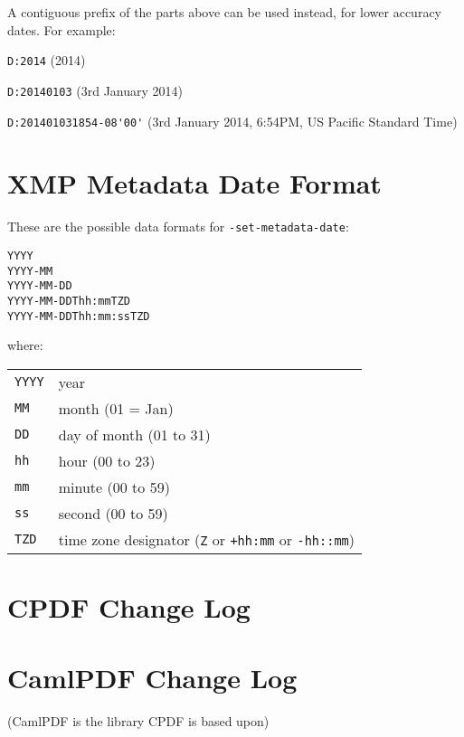 \documentclass{book}
\begin{document}
\noindent A contiguous prefix of the parts above can be used instead, for lower
accuracy dates. For example:

\begin{framed}
   \small\noindent\verb!D:2014! (2014)
   
   \vspace{1.5mm}
   \noindent\verb!D:20140103! (3rd January 2014)

   \vspace{1.5mm}
   \noindent\verb!D:201401031854-08'00'! (3rd January 2014, 6:54PM, US Pacific Standard Time)
   
\end{framed}

\section{XMP Metadata Date Format}
\label{xmpdate}


These are the possible data formats for \texttt{-set-metadata-date}:

\begin{verbatim}
YYYY
YYYY-MM
YYYY-MM-DD
YYYY-MM-DDThh:mmTZD
YYYY-MM-DDThh:mm:ssTZD
\end{verbatim}

\noindent where:

\medskip
\begin{tabular}{ll}
\texttt{YYYY} & year \\
\texttt{MM} & month (01 = Jan)\\
\texttt{DD} & day of month (01 to 31)\\
\texttt{hh} & hour (00 to 23)\\
\texttt{mm} & minute (00 to 59)\\
\texttt{ss} & second (00 to 59)\\
\texttt{TZD} & time zone designator (\texttt{Z} or \texttt{+hh:mm} or \texttt{-hh::mm})
\end{tabular}
\pagestyle{fancy}


\section{CPDF Change Log}
{\footnotesize\begin{alltt}

\end{alltt}}

\section{CamlPDF Change Log}
(CamlPDF is the library CPDF is based upon)

{\footnotesize\begin{alltt}

\end{alltt}}


\backmatter
\pagestyle{fancy}

\printindex
\end{document}
